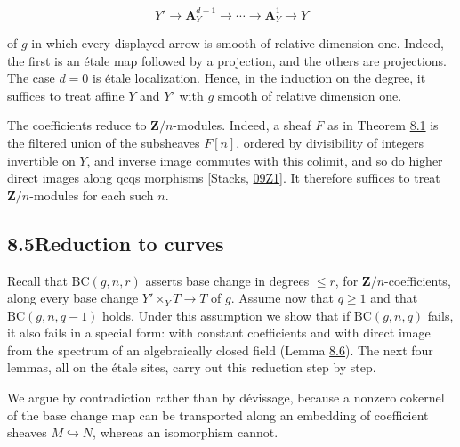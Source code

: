 \documentclass[11pt]{article}
\begin{document}
\[
Y'\longrightarrow\mathbf A^{d-1}_Y
\longrightarrow\cdots\longrightarrow\mathbf A^1_Y
\longrightarrow Y
\]

of \(g\) in which every displayed arrow is smooth of relative dimension one. Indeed, the first is an étale map followed by a projection, and the others are projections. The case \(d=0\) is étale localization. Hence, in the induction on the degree, it suffices to treat affine \(Y\) and \(Y'\) with \(g\) smooth of relative dimension one.

The coefficients reduce to \(\mathbf Z/n\)-modules. Indeed, a sheaf \(F\) as in Theorem \hyperref[bp643]{8.1} is the filtered union of the subsheaves \(F[n]\), ordered by divisibility of integers invertible on \(Y\), and inverse image commutes with this colimit, and so do higher direct images along qcqs morphisms [Stacks, \href{https://stacks.math.columbia.edu/tag/09Z1}{09Z1}]. It therefore suffices to treat \(\mathbf Z/n\)-modules for each such \(n\).


\subsection*{\texorpdfstring{8.5\quad Reduction to curves}{8.5 Reduction to curves}}
\label{bp651}%
\label{bp652}%
Recall that \(\mathrm{BC}(g,n,r)\) asserts base change in degrees \(\leq r\), for \(\mathbf Z/n\)-coefficients, along every base change \(Y'\times_YT\to T\) of \(g\). Assume now that \(q\geq1\) and that \(\mathrm{BC}(g,n,q-1)\) holds. Under this assumption we show that if \(\mathrm{BC}(g,n,q)\) fails, it also fails in a special form: with constant coefficients and with direct image from the spectrum of an algebraically closed field (Lemma \hyperref[bp662]{8.6}). The next four lemmas, all on the étale sites, carry out this reduction step by step.

We argue by contradiction rather than by dévissage, because a nonzero cokernel of the base change map can be transported along an embedding of coefficient sheaves \(M\hookrightarrow N\), whereas an isomorphism cannot.
\end{document}
